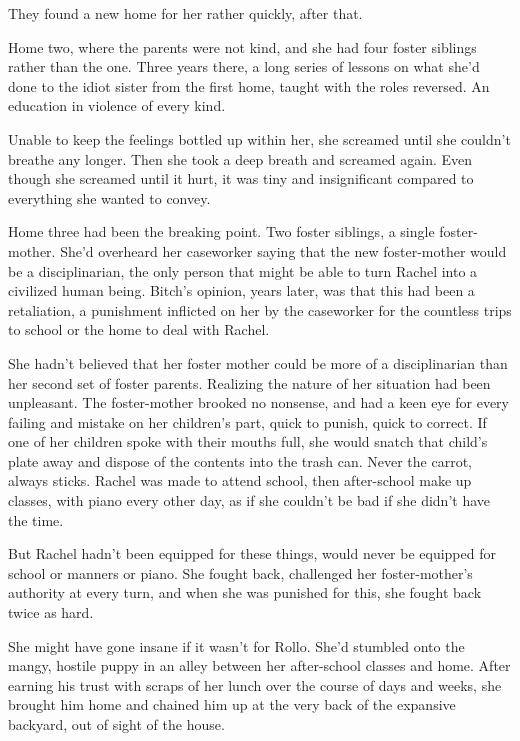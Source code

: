 They found a new home for her rather quickly, after that.



Home two, where the parents were not kind, and she had four foster siblings rather than the one.  Three years there, a long series of lessons on what she'd done to the idiot sister from the first home, taught with the roles reversed.  An education in violence of every kind.



Unable to keep the feelings bottled up within her, she screamed until she couldn't breathe any longer.  Then she took a deep breath and screamed again.  Even though she screamed until it hurt, it was tiny and insignificant compared to everything she wanted to convey.



Home three had been the breaking point.  Two foster siblings, a single foster-mother.  She'd overheard her caseworker saying that the new foster-mother would be a disciplinarian, the only person that might be able to turn Rachel into a civilized human being.  Bitch's opinion, years later, was that this had been a retaliation, a punishment inflicted on her by the caseworker for the countless trips to school or the home to deal with Rachel.



She hadn't believed that her foster mother could be more of a disciplinarian than her second set of foster parents.  Realizing the nature of her situation had been unpleasant.  The foster-mother brooked no nonsense, and had a keen eye for every failing and mistake on her children's part, quick to punish, quick to correct.  If one of her children spoke with their mouths full, she would snatch that child's plate away and dispose of the contents into the trash can.  Never the carrot, always sticks.  Rachel was made to attend school, then after-school make up classes, with piano every other day, as if she couldn't be bad if she didn't have the time.



But Rachel hadn't been equipped for these things, would never be equipped for school or manners or piano.  She fought back, challenged her foster-mother's authority at every turn, and when she was punished for this, she fought back twice as hard.



She might have gone insane if it wasn't for Rollo.  She'd stumbled onto the mangy, hostile puppy in an alley between her after-school classes and home.  After earning his trust with scraps of her lunch over the course of days and weeks, she brought him home and chained him up at the very back of the expansive backyard, out of sight of the house.



